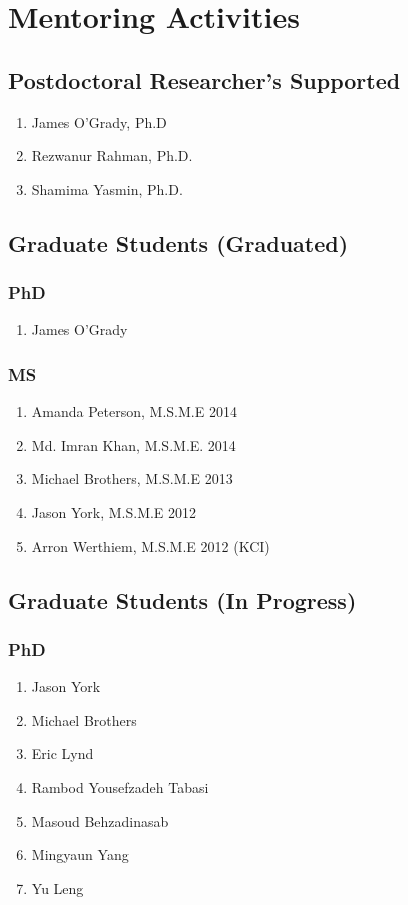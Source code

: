 \section*{Mentoring Activities}


\subsection*{Postdoctoral Researcher's Supported}
  \begin{enumerate}
    \item James O'Grady, Ph.D
    \item Rezwanur Rahman, Ph.D.
    \item Shamima Yasmin, Ph.D.
  \end{enumerate}

\subsection*{Graduate Students (Graduated)}

\subsubsection*{PhD}
\begin{enumerate}
  \item James O'Grady
\end{enumerate}

\subsubsection*{MS}
\begin{enumerate}
    \item Amanda Peterson, M.S.M.E 2014
    \item Md. Imran Khan, M.S.M.E. 2014
    \item Michael Brothers, M.S.M.E 2013
    \item Jason York, M.S.M.E 2012
    \item Arron Werthiem, M.S.M.E 2012 (KCI)
\end{enumerate}

\subsection*{Graduate Students (In Progress)}

\subsubsection*{PhD}
\begin{enumerate}
  \item Jason York
  \item Michael Brothers
  \item Eric Lynd
  \item Rambod Yousefzadeh Tabasi
  \item Masoud Behzadinasab
  \item Mingyaun Yang
  \item Yu Leng
\end{enumerate}

